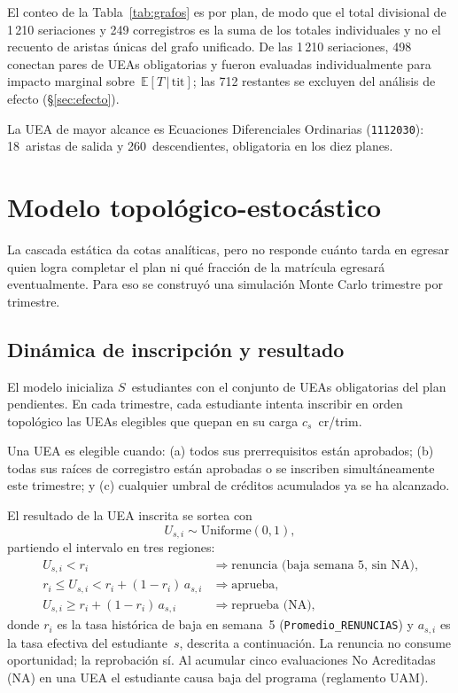 \documentclass[11pt,letterpaper]{article}
\newcommand{\uea}[1]{\texttt{#1}}
\newcommand{\ETtit}{\mathbb{E}[T\,|\,\mathrm{tit}]}
\begin{document}
El conteo de la Tabla~\ref{tab:grafos} es por plan, de modo que el total divisional de 1\,210 seriaciones y 249 corregistros es la suma de los totales individuales y no el recuento de aristas únicas del grafo unificado.
De las 1\,210 seriaciones, 498 conectan pares de UEAs obligatorias y fueron evaluadas individualmente para impacto marginal sobre~$\ETtit$; las 712 restantes se excluyen del análisis de efecto (\S\ref{sec:efecto}).

La UEA de mayor alcance es Ecuaciones Diferenciales Ordinarias (\uea{1112030}):
18~aristas de salida y 260~descendientes, obligatoria en los diez planes.

\section{Modelo topológico-estocástico}
\label{sec:modelo}

La cascada estática da cotas analíticas, pero no responde cuánto tarda
en egresar quien logra completar el plan ni qué fracción de la matrícula
egresará eventualmente.
Para eso se construyó una simulación Monte Carlo trimestre por trimestre.

\subsection{Dinámica de inscripción y resultado}

El modelo inicializa $S$~estudiantes con el conjunto de UEAs obligatorias del
plan pendientes.
En cada trimestre, cada estudiante intenta inscribir en orden topológico las
UEAs elegibles que quepan en su carga $c_s$~cr/trim.

Una UEA es elegible cuando: (a) todos sus prerrequisitos están aprobados;
(b) todas sus raíces de corregistro están aprobadas o se inscriben
simultáneamente este trimestre; y (c) cualquier umbral de créditos acumulados
ya se ha alcanzado.

El resultado de la UEA inscrita se sortea con
\begin{equation}
  U_{s,i}\sim\mathrm{Uniforme}(0,1),
  \label{eq:sorteo}
\end{equation}
partiendo el intervalo en tres regiones:
\begin{align}
  U_{s,i} < r_i
    &\;\Longrightarrow\; \text{renuncia (baja semana~5, sin NA),}
    \label{eq:renuncia}\\
  r_i \leq U_{s,i} < r_i + (1-r_i)\,a_{s,i}
    &\;\Longrightarrow\; \text{aprueba,}
    \label{eq:aprueba}\\
  U_{s,i} \geq r_i + (1-r_i)\,a_{s,i}
    &\;\Longrightarrow\; \text{reprueba (NA),}
    \label{eq:reproba}
\end{align}
donde $r_i$ es la tasa histórica de baja en semana~5
(\texttt{Promedio\_RENUNCIAS}) y $a_{s,i}$ es la tasa efectiva del
estudiante~$s$, descrita a continuación.
La renuncia no consume oportunidad; la reprobación sí.
Al acumular cinco evaluaciones No Acreditadas (NA) en una UEA el estudiante causa baja del programa
(reglamento UAM).
\end{document}
